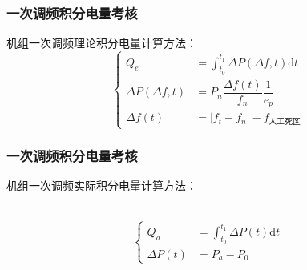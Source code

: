 \documentclass[aspectratio=169, 10pt, utf8, mathserif]{beamer}
\begin{document}
	\begin{frame}
		\frametitle{一次调频积分电量考核}
		机组一次调频理论积分电量计算方法：
		\begin{equation}
			\left\{	\begin{aligned}
				 Q_{e}&=\int_{t_{0}}^{t_{1}} \Delta P(\Delta f,t)\mathrm{d}t\\
				\Delta P(\Delta f,t)&=P_{n}\dfrac{\Delta f(t)}{f_{n}}\dfrac{1}{e_{p}}\\
				\Delta f(t)&=|f_{t}-f_{n}|-f_{\texttt{人工死区}}\nonumber
			\end{aligned}\right.
		\end{equation}
	\end{frame}

	\begin{frame}
	\frametitle{一次调频积分电量考核}
	\zihao{3}
	机组一次调频实际积分电量计算方法：
	
	\ \\
	
	\zihao{4}
	\begin{equation}
		\left\{	\begin{aligned}
			Q_{a}&=\int_{t_{0}}^{t_{1}}\Delta P(t) \mathrm{d}t\\
		\Delta P(t)&=P_{a}-P_{0}\nonumber
		\end{aligned}\right.
	\end{equation}
\end{frame}
\end{document}

